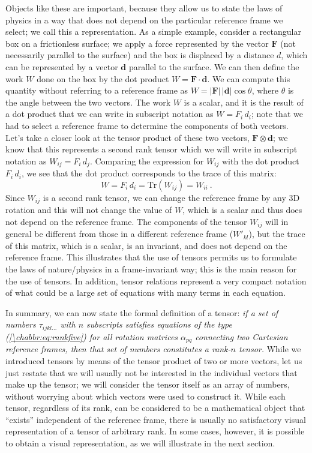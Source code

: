 Objects like these are important, because they allow us to state the laws of physics in a way that does not depend on the particular reference frame we select; we call this a  representation.  As a simple example, consider a rectangular box on a frictionless surface; we apply a force represented by the vector $\mathbf{F}$ (not necessarily parallel to the surface) and the box is displaced by a distance $d$, which can be represented by a vector $\mathbf{d}$ parallel to the surface. We can then define the work $W$ done on the box by the dot product $W=\mathbf{F}\cdot\mathbf{d}$.  We can compute this quantity without referring to a reference frame as $W=\vert\mathbf{F}\vert\,\vert\mathbf{d}\vert\cos\theta$, where $\theta$ is the angle between the two vectors.  The work $W$ is a scalar, and it is the result of a dot product that we can write in subscript notation as $W=F_i\,d_i$; note that we had to select a reference frame to determine the components of both vectors.  Let's take a closer look at the tensor product of these two vectors, $\mathbf{F}\otimes\mathbf{d}$; we know that this represents a second rank tensor which we will write in subscript notation as $W_{ij}=F_i\,d_j$.  Comparing the expression for $W_{ij}$ with the dot product $F_i\,d_i$, we see that the dot product corresponds to the trace of this matrix:
\[
	W = F_i\,d_i = \text{Tr}(W_{ij}) = W_{ii}\ .
\]
Since $W_{ij}$ is a second rank tensor, we can change the reference frame by any 3D rotation and this will not change the value of $W$, which is a scalar and thus does not depend on the reference frame.  The components of the tensor $W_{ij}$ will in general be different from those in a different reference frame ($W'_{kl}$), but the trace of this matrix, which is a scalar, is an invariant, and does not depend on the reference frame.  This illustrates that the use of tensors permits us to formulate the laws of nature/physics in a frame-invariant way; this is the main reason for the use of tensors.  In addition, tensor relations represent a very compact notation of what could be a large set of equations with many terms in each equation.

In summary,  we can now state the formal definition of a tensor: \textit{if a set of numbers $\tau_{ijkl\ldots}$ with $n$ subscripts satisfies equations of the type (\ref{\chabbr:eq:rankfive}) for all rotation matrices $\alpha_{pq}$ connecting two Cartesian reference frames, then that set of numbers constitutes a rank-$n$ tensor.}  While we introduced tensors by means of the tensor product of two or more vectors, let us just restate that we will usually not be interested in the individual vectors that make up the tensor; we will consider the tensor itself as an array of numbers, without worrying about which vectors were used to construct it. While each tensor, regardless of its rank, can be considered to be a mathematical object that ``exists'' independent of the reference frame, there is usually no satisfactory visual representation of a tensor of arbitrary rank.  In some cases, however, it is possible to obtain a visual representation, as we will illustrate in the next section.


